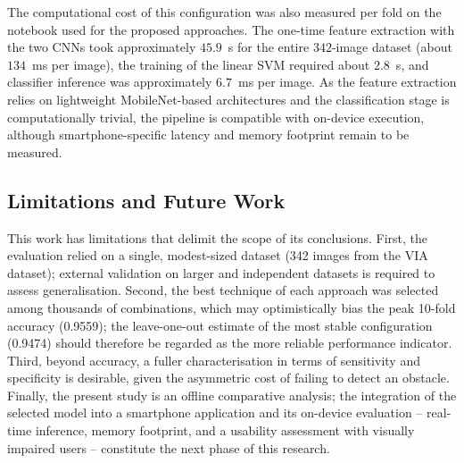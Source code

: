 \documentclass[preprint,12pt]{elsarticle}
\begin{document}
The computational cost of this configuration was also measured per fold on the notebook used for the proposed approaches. The one-time feature extraction with the two CNNs took approximately $45.9$~s for the entire $342$-image dataset (about $134$~ms per image), the training of the linear SVM required about $2.8$~s, and classifier inference was approximately $6.7$~ms per image. As the feature extraction relies on lightweight MobileNet-based architectures and the classification stage is computationally trivial, the pipeline is compatible with on-device execution, although smartphone-specific latency and memory footprint remain to be measured.

\subsection*{Limitations and Future Work}
This work has limitations that delimit the scope of its conclusions. First, the evaluation relied on a single, modest-sized dataset (342 images from the VIA dataset); external validation on larger and independent datasets is required to assess generalisation. Second, the best technique of each approach was selected among thousands of combinations, which may optimistically bias the peak 10-fold accuracy (0.9559); the leave-one-out estimate of the most stable configuration (0.9474) should therefore be regarded as the more reliable performance indicator. Third, beyond accuracy, a fuller characterisation in terms of sensitivity and specificity is desirable, given the asymmetric cost of failing to detect an obstacle. Finally, the present study is an offline comparative analysis; the integration of the selected model into a smartphone application and its on-device evaluation -- real-time inference, memory footprint, and a usability assessment with visually impaired users -- constitute the next phase of this research.
\end{document}
